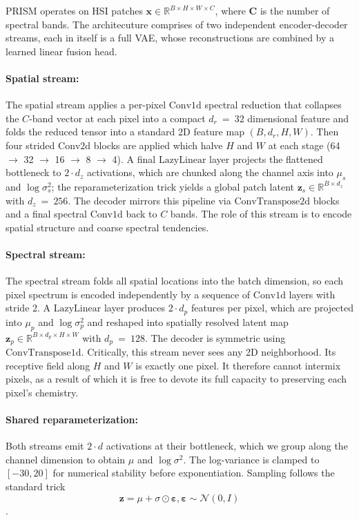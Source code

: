 \documentclass{article} %
\begin{document}
PRISM operates on HSI patches $\mathbf{x} \in \mathbb{R}^{B \times H \times W \times C}$, where $\mathbf{C}$ is the number of spectral bands. The architecuture comprises of two independent encoder-decoder streams, each in itself is a full VAE, whose reconstructions are combined by a learned linear fusion head.

\paragraph{Spatial stream:} The spatial stream applies a per-pixel $\mathrm{Conv1d}$ spectral reduction that collapses the $C$-band vector at each pixel into a compact $d_r\ {=}\ 32$ dimensional feature and folds the reduced tensor into a standard 2D feature map $(B, d_r, H, W)$. Then four strided $\mathrm{Conv2d}$ blocks are applied which halve $H$ and $W$ at each stage (64 $\rightarrow$ 32 $\rightarrow$ 16 $\rightarrow$ 8 $\rightarrow$ 4). A final $\mathrm{LazyLinear}$ layer projects the flattened bottleneck to $2 \cdot d_z$ activations, which are chunked along the channel axis into $\mu_s$ and $\log \sigma_s^2$; the reparameterization trick yields a global patch latent $\mathbf{z}_s \in \mathbb{R}^{B \times d_z}$ with $d_z\ {=}\ 256$. The decoder mirrors this pipeline via $\mathrm{ConvTranspose2d}$ blocks and a final spectral $\mathrm{Conv1d}$ back to $C$ bands. The role of this stream is to encode spatial structure and coarse spectral tendencies.

\paragraph{Spectral stream:} The spectral stream folds all spatial locations into the batch dimension, so each pixel spectrum is encoded independently by a sequence of $\mathrm{Conv1d}$ layers with stride 2. A $\mathrm{LazyLinear}$ layer produces $2 \cdot d_p$ features per pixel, which are projected into $\mu_p$ and $\log \sigma_p^2$ and reshaped into spatially resolved latent map $\mathbf{z}_p \in \mathbb{R}^{B \times d_p \times H \times W}$ with $d_p\ {=}\ 128$. The decoder is symmetric using $\mathrm{ConvTranspose1d}$. Critically, this stream never sees any 2D neighborhood. Its receptive field along $H$ and $W$ is exactly one pixel. It therefore cannot intermix pixels, as a result of which it is free to devote its full capacity to preserving each pixel's chemistry.

\paragraph{Shared reparameterization: } Both streams emit $2 \cdot d$ activations at their bottleneck, which we group along the channel dimension to obtain $\mu$ and $\log \sigma^2$. The log-variance is clamped to $[-30, 20]$ for numerical stability before exponentiation. Sampling follows the standard trick
\[ \mathbf{z} = \mu + \sigma \odot \boldsymbol{\varepsilon}, \boldsymbol{\varepsilon} \sim \mathcal{N}(0, I) \].
\end{document}
